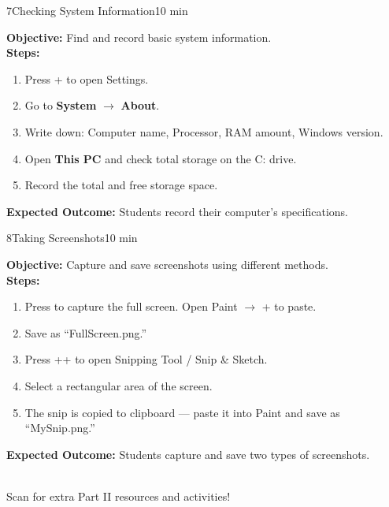 \begin{labactivity}{7}{Checking System Information}{10 min}

\textbf{Objective:} Find and record basic system information.\\[4pt]
\textbf{Steps:}
\begin{enumerate}[label=\protect\stepcircle{\arabic*}, leftmargin=2cm, itemsep=4pt]
  \item Press + to open Settings.
  \item Go to \textbf{System} $\rightarrow$ \textbf{About}.
  \item Write down: Computer name, Processor, RAM amount, Windows version.
  \item Open \textbf{This PC} and check total storage on the C: drive.
  \item Record the total and free storage space.
\end{enumerate}
\textbf{Expected Outcome:} Students record their computer's specifications.
\welldone
\end{labactivity}

\begin{labactivity}{8}{Taking Screenshots}{10 min}

\textbf{Objective:} Capture and save screenshots using different methods.\\[4pt]
\textbf{Steps:}
\begin{enumerate}[label=\protect\stepcircle{\arabic*}, leftmargin=2cm, itemsep=4pt]
  \item Press  to capture the full screen. Open Paint $\rightarrow$ + to paste.
  \item Save as ``FullScreen.png.''
  \item Press ++ to open Snipping Tool / Snip \& Sketch.
  \item Select a rectangular area of the screen.
  \item The snip is copied to clipboard --- paste it into Paint and save as ``MySnip.png.''
\end{enumerate}
\textbf{Expected Outcome:} Students capture and save two types of screenshots.
\welldone
\end{labactivity}

\vspace{12pt}
\begin{center}
  \\[6pt]
  {\small\sffamily\textcolor{NavyBlue}{Scan for extra Part II resources and activities!}}
\end{center}

